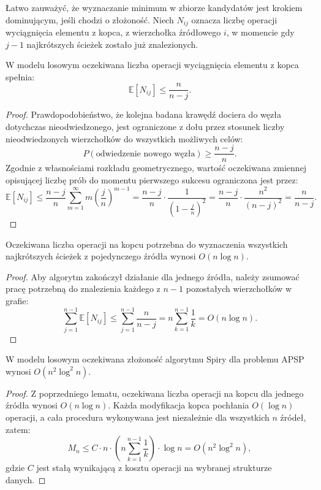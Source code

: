 Łatwo zauważyć, że wyznaczanie minimum w zbiorze kandydatów jest krokiem dominującym, jeśli chodzi o złożoność. Niech $N_{ij}$ oznacza liczbę operacji wyciągnięcia elementu z kopca, z wierzchołka źródłowego $i$, w momencie gdy $j-1$ najkrótszych ścieżek zostało już znalezionych.

\begin{lemat}
W modelu losowym oczekiwana liczba operacji wyciągnięcia elementu z kopca spełnia:
\[
\mathbb{E}[N_{ij}] \leq \frac{n}{n-j}.
\]
\end{lemat}

\begin{proof}
Prawdopodobieństwo, że kolejna badana krawędź dociera do węzła dotychczas nieodwiedzonego, jest ograniczone z dołu przez stosunek liczby nieodwiedzonych wierzchołków do wszystkich możliwych celów:
\[
P(\text{odwiedzenie nowego węzła}) \geq \frac{n-j}{n}.
\]
Zgodnie z własnościami rozkładu geometrycznego, wartość oczekiwana zmiennej opisującej liczbę prób do momentu pierwszego sukcesu ograniczona jest przez:
\[
\mathbb{E}[N_{ij}]
\leq \frac{n-j}{n} \sum_{m=1}^{\infty} m \left(\frac{j}{n}\right)^{m-1}
= \frac{n-j}{n} \cdot \frac{1}{\left(1 - \frac{j}{n}\right)^2}
= \frac{n-j}{n} \cdot \frac{n^2}{(n-j)^2}
= \frac{n}{n-j}.
\]
\end{proof}

\begin{lemat}
Oczekiwana liczba operacji na kopcu potrzebna do wyznaczenia wszystkich najkrótszych ścieżek z pojedynczego źródła wynosi $O(n \log n)$.
\end{lemat}

\begin{proof}
Aby algorytm zakończył działanie dla jednego źródła, należy zsumować pracę potrzebną do znalezienia każdego z $n-1$ pozostałych wierzchołków w grafie:
\[
\sum_{j=1}^{n-1} \mathbb{E}[N_{ij}] \leq \sum_{j=1}^{n-1} \frac{n}{n-j} = n \sum_{k=1}^{n-1} \frac{1}{k} = O(n \log n).
\]
\end{proof}

\begin{twierdzenie}
W modelu losowym oczekiwana złożoność algorytmu Spiry dla problemu APSP wynosi $O(n^2 \log^2 n)$.
\end{twierdzenie}

\begin{proof}
Z poprzedniego lematu, oczekiwana liczba operacji na kopcu dla jednego źródła wynosi $O(n \log n)$. Każda modyfikacja kopca pochłania $O(\log n)$ operacji, a cała procedura wykonywana jest niezależnie dla wszystkich $n$ źródeł, zatem:
\[
M_n \leq C \cdot n \cdot \left( n \sum_{k=1}^{n-1} \frac{1}{k} \right) \cdot \log n = O(n^2 \log^2 n),
\]
gdzie $C$ jest stałą wynikającą z kosztu operacji na wybranej strukturze danych.
\end{proof}

